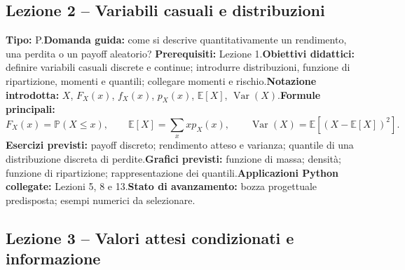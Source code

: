 \documentclass[12pt,a4paper]{article}%
\begin{document}
\subsection{Lezione 2 -- Variabili casuali e distribuzioni}

\textbf{Tipo:} P.\newline\textbf{Domanda guida:} come si descrive
quantitativamente un rendimento, una perdita o un payoff aleatorio?\newline%
\textbf{Prerequisiti:} Lezione 1.\newline\textbf{Obiettivi didattici:}
definire variabili casuali discrete e continue; introdurre distribuzioni,
funzione di ripartizione, momenti e quantili; collegare momenti e
rischio.\newline\textbf{Notazione introdotta:} $X$, $F_{X}(x)$, $f_{X}(x)$,
$p_{X}(x)$, $\mathbb{E}[X]$, $\operatorname{Var}(X)$.\newline\textbf{Formule
principali:}
\[
F_{X}(x)=\mathbb{P}(X\leq x), \qquad\mathbb{E}[X]=\sum_{x} x p_{X}(x),
\qquad\operatorname{Var}(X)=\mathbb{E}\left[  (X-\mathbb{E}[X])^{2}\right]  .
\]
\textbf{Esercizi previsti:} payoff discreto; rendimento atteso e varianza;
quantile di una distribuzione discreta di perdite.\newline\textbf{Grafici
previsti:} funzione di massa; densit\`{a}; funzione di ripartizione;
rappresentazione dei quantili.\newline\textbf{Applicazioni Python collegate:}
Lezioni 5, 8 e 13.\newline\textbf{Stato di avanzamento:} bozza progettuale
predisposta; esempi numerici da selezionare.

\subsection{Lezione 3 -- Valori attesi condizionati e informazione}
\end{document}
